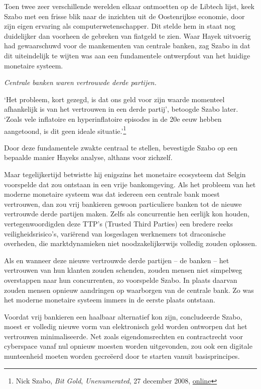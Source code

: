 \documentclass[
  a5paper,
  smalldemyvopaper,11pt,twoside,onecolumn,openright,extrafontsizes,
hidelinks]{memoir}
\begin{document}
Toen twee zeer verschillende werelden elkaar ontmoetten op de Libtech
lijst, keek Szabo met een frisse blik naar de inzichten uit de
Oostenrijkse economie, door zijn eigen ervaring als
computerwetenschapper. Dit stelde hem in staat nog duidelijker dan
voorheen de gebreken van fiatgeld te zien. Waar Hayek uitvoerig had
gewaarschuwd voor de mankementen van centrale banken, zag Szabo in dat
dit uiteindelijk te wijten was aan een fundamentele ontwerpfout van het
huidige monetaire systeem.

\emph{Centrale banken waren vertrouwde derde partijen.}

`Het probleem, kort gezegd, is dat ons geld voor zijn waarde momenteel
afhankelijk is van het vertrouwen in een derde partij', betoogde Szabo
later. `Zoals vele inflatoire en hyperinflatoire episodes in de 20e eeuw
hebben aangetoond, is dit geen ideale situatie.'\footnote{Nick Szabo,
  \emph{Bit Gold}, \emph{Unenumerated}, 27 december 2008,
  \href{https://unenumerated.blogspot.com/2005/12/bit-gold.html}{online}}

Door deze fundamentele zwakte centraal te stellen, bevestigde Szabo op
een bepaalde manier Hayeks analyse, althans voor zichzelf.

Maar tegelijkertijd betwistte hij enigszins het monetaire ecosysteem dat
Selgin voorspelde dat zou ontstaan in een vrije bankomgeving. Als het
probleem van het moderne monetaire systeem was dat iedereen een centrale
bank moest vertrouwen, dan zou vrij bankieren gewoon particuliere banken
tot de nieuwe vertrouwde derde partijen maken. Zelfs als concurrentie
hen eerlijk kon houden, vertegenwoordigden deze TTP's (Trusted Third
Parties) een bredere reeks veiligheidsrisico's, variërend van
losgeslagen werknemers tot draconische overheden, die marktdynamieken
niet noodzakelijkerwijs volledig zouden oplossen.

Als en wanneer deze nieuwe vertrouwde derde partijen -- de banken -- het
vertrouwen van hun klanten zouden schenden, zouden mensen niet simpelweg
overstappen naar hun concurrenten, zo voorspelde Szabo. In plaats
daarvan zouden mensen opnieuw aandringen op waarborgen van de centrale
bank. Zo was het moderne monetaire systeem immers in de eerste plaats
ontstaan.

Voordat vrij bankieren een haalbaar alternatief kon zijn, concludeerde
Szabo, moest er volledig nieuwe vorm van elektronisch geld worden
ontworpen dat het vertrouwen minimaliseerde. Net zoals eigendomsrechten
en contractrecht voor cyberspace vanaf nul opnieuw moesten worden
uitgevonden, zou ook een digitale munteenheid moeten worden gecreëerd
door te starten vanuit basisprincipes.
\end{document}
